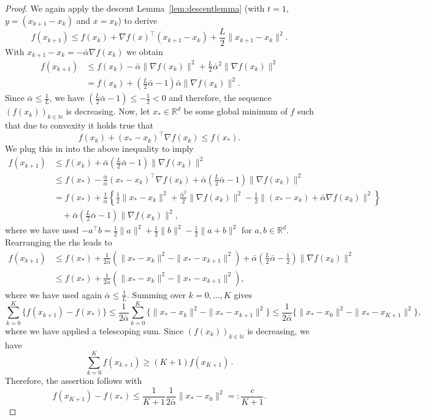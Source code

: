 \documentclass[12pt,openany]{book}
\theoremstyle{definition}
\theoremstyle{definition}
\newcommand{\N}{\mathbb{N}}
\newcommand{\R}{\mathbb{R}}
\begin{document}
\begin{proof}
We again apply the descent Lemma~\ref{lem:descentlemma} (with $t=1$, $y=(x_{k+1}-x_k)$ and $x=x_k$) to derive
\[f(x_{k+1})\le f(x_k) + \nabla f(x)^\top (x_{k+1}-x_k) + \frac{L}{2} \|x_{k+1}-x_k\|^2. \]
With $x_{k+1}-x_k=-\bar\alpha \nabla f(x_k)$ we obtain
\begin{align*}
f(x_{k+1}) &\le f(x_k) - \bar\alpha \|\nabla f(x_k)\|^2 + \frac{L}{2}\bar\alpha^2 \|\nabla f(x_k)\|^2\\
&= f(x_k) +(\frac{L}{2}\bar\alpha - 1)\bar \alpha \|\nabla f(x_k)\|^2.
\end{align*}
Since $\bar\alpha\le \frac{1}{L}$, we have $(\frac{L}{2}\bar\alpha - 1)\le -\frac{1}{2}<0$ and therefore, the sequence $(f(x_k))_{k\in\N}$ is decreasing. Now, let $x_\ast\in\R^d$ be some global minimum of $f$ such that due to convexity it holds true that
\[f(x_k) + (x_\ast-x_k)^\top \nabla f(x_k) \le f(x_\ast). \]
We plug this in into the above inequality to imply
\begin{align*}
f(x_{k+1}) &\le f(x_k) + \bar \alpha(\frac{L}{2}\bar\alpha - 1) \|\nabla f(x_k)\|^2\\
&\le f(x_\ast) - \frac{\bar\alpha}{\bar\alpha} (x_\ast-x_k)^\top \nabla f(x_k) + \bar \alpha(\frac{L}{2}\bar\alpha - 1) \|\nabla f(x_k)\|^2\\
&=f(x_\ast) + \frac{1}{\bar\alpha}\left\{\frac{1}{2}\|x_\ast-x_k\|^2 + \frac{\bar\alpha^2}{2}\|\nabla f(x_k)\|^2 - \frac{1}{2}\|(x_\ast-x_k)+ \bar\alpha\nabla f(x_k)\|^2 \right\}\\&\quad + \bar \alpha(\frac{L}{2}\bar\alpha - 1) \|\nabla f(x_k)\|^2,
\end{align*}
where we have used $-a^\top b = \frac12 \|a\|^2 + \frac12\|b\|^2 - \frac12\|a+b\|^2$ for $a,b\in\R^d$. Rearranging the rhs leads to
\begin{align*}
f(x_{k+1}) &\le f(x_\ast) + \frac{1}{2\bar \alpha} \left(\|x_\ast-x_k\|^2 - \|x_\ast - x_{k+1}\|^2\right) + \bar\alpha(\frac{L}{2}\bar\alpha-\frac12) \|\nabla f(x_k)\|^2 \\ &\le f(x_\ast) + \frac{1}{2\bar \alpha} \left(\|x_\ast-x_k\|^2 - \|x_\ast - x_{k+1}\|^2\right),
\end{align*}
where we have used again $\bar\alpha\le\frac{1}{L}$. Summing over $k=0,\dots,K$ gives
\[\sum_{k=0}^K \{f(x_{k+1}) - f(x_\ast)\} \le \frac{1}{2\bar\alpha}\sum_{k=0}^{K} \{\|x_\ast-x_k\|^2 - \|x_\ast-x_{k+1}\|^2\}\le \frac{1}{2\bar\alpha} \{\|x_\ast-x_0\|^2-\|x_\ast-x_{K+1}\|^2\},\]
where we have applied a telescoping sum.
Since $(f(x_k))_{k\in\mathbb N}$ is decreasing, we have
\[\sum_{k=0}^K f(x_{k+1})\ge (K+1) f(x_{K+1})\,.\]
Therefore, the assertion follows with
\[f(x_{K+1})-f(x_\ast) \le \frac{1}{K+1} \frac{1}{2\bar\alpha} \|x_\ast-x_0\|^2 =: \frac{c}{K+1}. \]
\end{proof}
\end{document}
